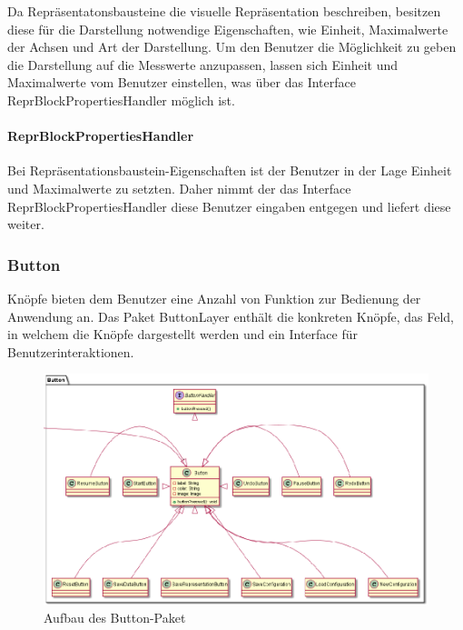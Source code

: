 \documentclass[parskip=full]{scrartcl}
\begin{document}
Da Repräsentatonsbausteine die visuelle Repräsentation beschreiben, besitzen diese für die Darstellung notwendige Eigenschaften, wie Einheit, Maximalwerte der Achsen und Art der Darstellung. Um den Benutzer die Möglichkeit zu geben die Darstellung auf die Messwerte anzupassen, lassen sich Einheit und Maximalwerte vom Benutzer einstellen, was über das Interface ReprBlockPropertiesHandler möglich ist.

\paragraph{ReprBlockPropertiesHandler}

Bei Repräsentationsbaustein-Eigenschaften ist der Benutzer in der Lage Einheit und Maximalwerte zu setzten. Daher nimmt der das Interface ReprBlockPropertiesHandler diese Benutzer eingaben entgegen und liefert diese weiter.


\newpage

\subsubsection{Button}

Knöpfe bieten dem Benutzer eine Anzahl von Funktion zur Bedienung der Anwendung an. Das Paket ButtonLayer enthält die konkreten Knöpfe, das Feld, in welchem die Knöpfe dargestellt werden und ein Interface für Benutzerinteraktionen.

\begin{figure}[htbp]
	\begin{center}
		\includegraphics[width = 14cm]{Grafiken/View/ButtonNamespace.png}
		\caption{Aufbau des Button-Paket}
		\label{Entwurf_Grob}
	\end{center}
\end{figure}
\end{document}
